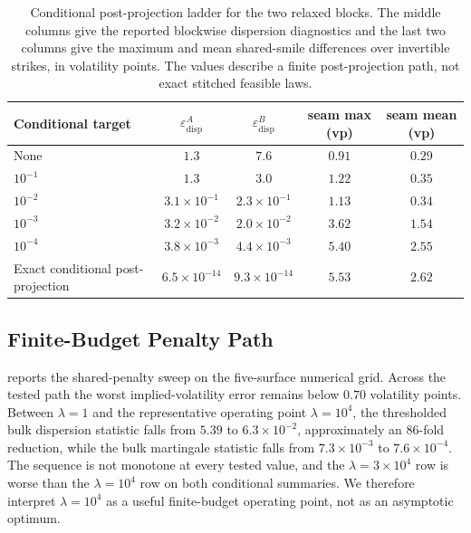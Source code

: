 \documentclass{article}
\newcommand{\edisp}{\varepsilon_{\mathrm{disp}}}
\begin{document}
\begin{table}[ht]
\centering
\caption{Conditional post-projection ladder for the two relaxed blocks.
The middle columns give the reported blockwise dispersion diagnostics and the last two columns give the maximum and mean shared-smile differences over invertible strikes, in volatility points.
The values describe a finite post-projection path, not exact stitched feasible laws.}
\label{tab:seam_tightness}
\small
\begin{tabular}{@{}lcccc@{}}
\toprule
Conditional target & $\edisp^{A}$ & $\edisp^{B}$ & seam max (vp) & seam mean (vp) \\
\midrule
None & $1.3$ & $7.6$ & $0.91$ & $0.29$ \\
$10^{-1}$ & $1.3$ & $3.0$ & $1.22$ & $0.35$ \\
$10^{-2}$ & $3.1\times10^{-1}$ & $2.3\times10^{-1}$ & $1.13$ & $0.34$ \\
$10^{-3}$ & $3.2\times10^{-2}$ & $2.0\times10^{-2}$ & $3.62$ & $1.54$ \\
$10^{-4}$ & $3.8\times10^{-3}$ & $4.4\times10^{-3}$ & $5.40$ & $2.55$ \\
Exact conditional post-projection & $6.5\times10^{-14}$ & $9.3\times10^{-14}$ & $5.53$ & $2.62$ \\
\bottomrule
\end{tabular}
\end{table}

\subsection{Finite-Budget Penalty Path}\label{subsec:market_penalty}

 reports the shared-penalty sweep on the five-surface numerical grid.
Across the tested path the worst implied-volatility error remains below $0.70$ volatility points.
Between $\lambda=1$ and the representative operating point $\lambda=10^4$, the thresholded bulk dispersion statistic falls from $5.39$ to $6.3\times10^{-2}$, approximately an $86$-fold reduction, while the bulk martingale statistic falls from $7.3\times10^{-3}$ to $7.6\times10^{-4}$.
The sequence is not monotone at every tested value, and the $\lambda=3\times10^4$ row is worse than the $\lambda=10^4$ row on both conditional summaries.
We therefore interpret $\lambda=10^4$ as a useful finite-budget operating point, not as an asymptotic optimum.
\end{document}
